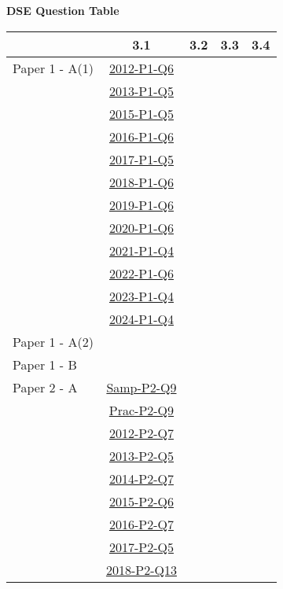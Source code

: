 \documentclass[12pt, a4paper]{article}
\begin{document}
\begin{absolutelynopagebreak}
\begin{center}
\textbf{DSE Question Table}
\end{center}
\begin{center}
\begin{tabular}{|l|c|c|c|c|}
\hline
        & 3.1 & 3.2 & 3.3 & 3.4 \\\hline
\hline
Paper 1 - A(1)& \hyperref[DSE2012-CoreP1-Q06]{2012-P1-Q6} &  &  &  \\
& \hyperref[DSE2013-CoreP1-Q05]{2013-P1-Q5} &  &  &  \\
& \hyperref[DSE2015-CoreP1-Q05]{2015-P1-Q5} &  &  &  \\
& \hyperref[DSE2016-CoreP1-Q06]{2016-P1-Q6} &  &  &  \\
& \hyperref[DSE2017-CoreP1-Q05]{2017-P1-Q5} &  &  &  \\
& \hyperref[DSE2018-CoreP1-Q06]{2018-P1-Q6} &  &  &  \\
& \hyperref[DSE2019-CoreP1-Q06]{2019-P1-Q6} &  &  &  \\
& \hyperref[DSE2020-CoreP1-Q06]{2020-P1-Q6} &  &  &  \\
& \hyperref[DSE2021-CoreP1-Q04]{2021-P1-Q4} &  &  &  \\
& \hyperref[DSE2022-CoreP1-Q06]{2022-P1-Q6} &  &  &  \\
& \hyperref[DSE2023-CoreP1-Q04]{2023-P1-Q4} &  &  &  \\
& \hyperref[DSE2024-CoreP1-Q04]{2024-P1-Q4} &  &  &  \\
\hline
Paper 1 - A(2)&  &  &  &  \\
\hline
Paper 1 - B&  &  &  &  \\
\hline
\hline
Paper 2 - A& \hyperref[DSE2012S-CoreP2-Q09]{Samp-P2-Q9} &  &  &  \\
& \hyperref[DSE2012P-CoreP2-Q09]{Prac-P2-Q9} &  &  &  \\
& \hyperref[DSE2012-CoreP2-Q07]{2012-P2-Q7} &  &  &  \\
& \hyperref[DSE2013-CoreP2-Q05]{2013-P2-Q5} &  &  &  \\
& \hyperref[DSE2014-CoreP2-Q07]{2014-P2-Q7} &  &  &  \\
& \hyperref[DSE2015-CoreP2-Q06]{2015-P2-Q6} &  &  &  \\
& \hyperref[DSE2016-CoreP2-Q07]{2016-P2-Q7} &  &  &  \\
& \hyperref[DSE2017-CoreP2-Q05]{2017-P2-Q5} &  &  &  \\
& \hyperref[DSE2018-CoreP2-Q13]{2018-P2-Q13} &  &  &  \\

\end{tabular}
\end{center}
\end{absolutelynopagebreak}
\end{document}
